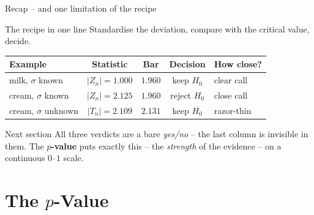 \documentclass[aspectratio=169,11pt]{beamer}
\begin{document}
\begin{frame}{Recap -- and one limitation of the recipe}
  \begin{block}{The recipe in one line}
    Standardise the deviation, compare with the critical value, decide.
  \end{block}
  \begin{center}
    \renewcommand{\arraystretch}{1.4}
    \begin{tabular}{@{}lcccl@{}}
      \toprule
      \textbf{Example} & \textbf{Statistic} & \textbf{Bar} &
        \textbf{Decision} & \textbf{How close?}\\
      \midrule
      milk, $\sigma$ known    & $|Z_n|=1.000$ & $1.960$
        & keep $H_0$            & clear call\\
      cream, $\sigma$ known   & $|Z_n|=2.125$ & $1.960$
        & \textcolor{hsbirot}{reject $H_0$} & close call\\
      cream, $\sigma$ unknown & $|T_n|=2.109$ & $2.131$
        & keep $H_0$            & razor-thin\\
      \bottomrule
    \end{tabular}
  \end{center}
  \begin{block}{Next section}
    All three verdicts are a bare \emph{yes/no} -- the last column is
    invisible in them. The \textbf{$p$-value} puts exactly this -- the
    \emph{strength} of the evidence -- on a continuous $0$--$1$ scale.
  \end{block}
\end{frame}
\section[\texorpdfstring{$p$}{p}-value]{The \texorpdfstring{$p$}{p}-Value}
\end{document}
